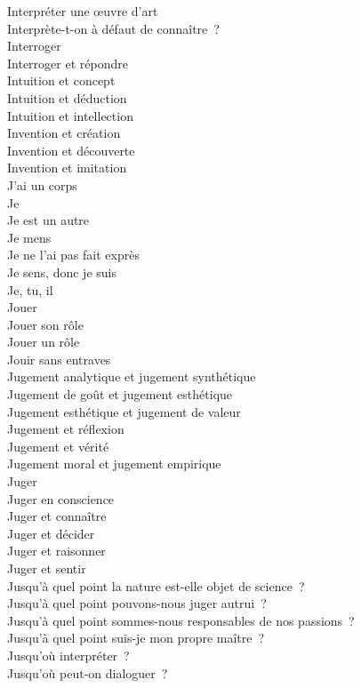 \documentclass[a4paper,12pt]{article}
\begin{document}
Interpréter une œuvre d'art \\
Interprète-t-on à défaut de connaître ? \\
Interroger \\
Interroger et répondre \\
Intuition et concept \\
Intuition et déduction \\
Intuition et intellection \\
Invention et création \\
Invention et découverte \\
Invention et imitation \\
J'ai un corps \\
Je \\
Je est un autre \\
Je mens \\
Je ne l'ai pas fait exprès \\
Je sens, donc je suis \\
Je, tu, il \\
Jouer \\
Jouer son rôle \\
Jouer un rôle \\
Jouir sans entraves \\
Jugement analytique et jugement synthétique \\
Jugement de goût et jugement esthétique \\
Jugement esthétique et jugement de valeur \\
Jugement et réflexion \\
Jugement et vérité \\
Jugement moral et jugement empirique \\
Juger \\
Juger en conscience \\
Juger et connaître \\
Juger et décider \\
Juger et raisonner \\
Juger et sentir \\
Jusqu'à quel point la nature est-elle objet de science ? \\
Jusqu'à quel point pouvons-nous juger autrui ? \\
Jusqu'à quel point sommes-nous responsables de nos passions ? \\
Jusqu'à quel point suis-je mon propre maître ? \\
Jusqu'où interpréter ? \\
Jusqu'où peut-on dialoguer ? \\
\end{document}
